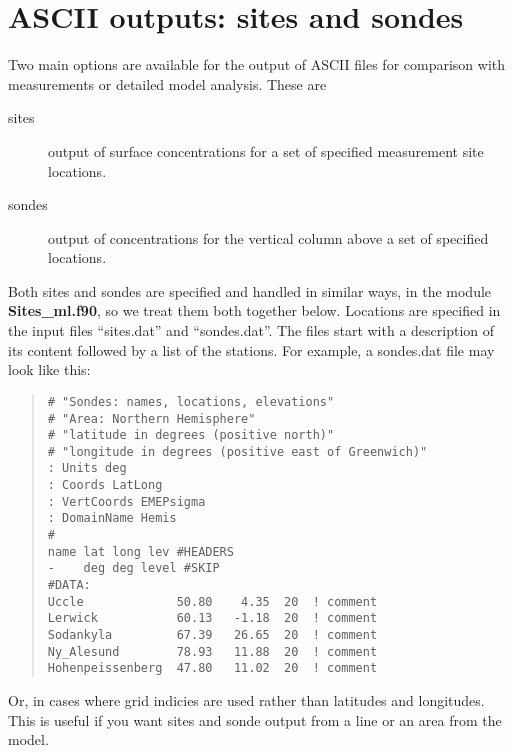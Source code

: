\newpage
\section{ASCII outputs: sites and sondes}\label{sec:sitesonde}


Two main options are available for the output of ASCII files for comparison
with measurements or detailed model analysis. These are

\begin{description}
\item[sites]  

      output of surface concentrations for a set of specified
      measurement site locations.
\item[sondes] 

      output of concentrations for the vertical column above
     a set of specified locations.
\end{description}

Both sites and sondes are specified and handled in similar ways, in
the module {\bf Sites\_ml.f90}, so we treat them both together below.
Locations are specified in the input files ``sites.dat'' and ``sondes.dat''. 
The files start with a description of its content
followed by a list of the stations. For example, a sondes.dat  file
may look like this:

\begin{small}
\begin{quote}
\begin{verbatim}
# "Sondes: names, locations, elevations"
# "Area: Northern Hemisphere"
# "latitude in degrees (positive north)"
# "longitude in degrees (positive east of Greenwich)"
: Units deg
: Coords LatLong
: VertCoords EMEPsigma
: DomainName Hemis
#
name lat long lev #HEADERS
-    deg deg level #SKIP
#DATA:
Uccle             50.80    4.35  20  ! comment
Lerwick           60.13   -1.18  20  ! comment
Sodankyla         67.39   26.65  20  ! comment
Ny_Alesund        78.93   11.88  20  ! comment
Hohenpeissenberg  47.80   11.02  20  ! comment
\end{verbatim}

\end{quote}
\end{small}

Or, in cases where grid indicies are used rather than latitudes and 
longitudes. This is useful if you want sites and sonde output from a line 
or an area from the model. 


